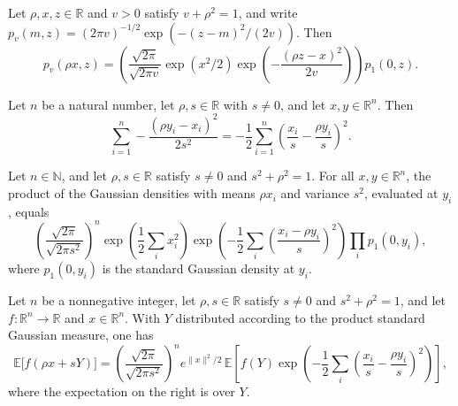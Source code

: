 \begin{lemma}
\label{BooleanAnalysis.GaussianSpace.gaussianPDFReal_noise_eq}
\leanok
{}
Let $\rho,x,z\in\mathbb R$ and $v>0$ satisfy $v+\rho^2=1$, and write $p_v(m,z)=(2\pi
v)^{-1/2}\exp(-(z-m)^2/(2v))$. Then
\[p_v(\rho x,z)=\left(\frac{\sqrt{2\pi}}{\sqrt{2\pi v}}\exp(x^2/2)\exp\left(-\frac{(\rho z-x)^2}{2v}\right)\right)p_1(0,z).\]
\end{lemma}

\begin{lemma}
\label{BooleanAnalysis.GaussianSpace.gaussianNoise_exponent_sum}
\leanok
{}
Let $n$ be a natural number, let $\rho,s\in\mathbb R$ with $s\ne0$, and let
$x,y\in\mathbb R^n$. Then
\[\sum_{i=1}^n -\frac{(\rho y_i-x_i)^2}{2s^2}=-\frac12\sum_{i=1}^n\left(\frac{x_i}{s}-\frac{\rho y_i}{s}\right)^2.\]
\end{lemma}

\begin{lemma}
\label{BooleanAnalysis.GaussianSpace.gaussianProductDensity_noise_eq}
\leanok
{}
Let $n\in\mathbb N$, and let $\rho,s\in\mathbb R$ satisfy $s\ne0$ and $s^2+\rho^2=1$.
For all $x,y\in\mathbb R^n$, the product of the Gaussian densities with means $\rho x_i$
and variance $s^2$, evaluated at $y_i$, equals
\[\left(\frac{\sqrt{2\pi}}{\sqrt{2\pi s^2}}\right)^n\exp\!\left(\frac{1}{2}\sum_i x_i^2\right)\exp\!\left(-\frac{1}{2}\sum_i\left(\frac{x_i-\rho y_i}{s}\right)^2\right)\prod_i p_1(0,y_i),\]
where $p_1(0,y_i)$ is the standard Gaussian density at $y_i$.
\end{lemma}

\begin{lemma}
\label{BooleanAnalysis.GaussianSpace.integral_gaussianNoise_densityFactorization}
\leanok
{}
Let $n$ be a nonnegative integer, let $\rho,s\in\mathbb R$ satisfy $s\ne0$ and
$s^2+\rho^2=1$, and let $f:\mathbb R^n\to\mathbb R$ and $x\in\mathbb R^n$. With $Y$
distributed according to the product standard Gaussian measure, one has
\[\mathbb E\bigl[f(\rho x+sY)\bigr]=\left(\frac{\sqrt{2\pi}}{\sqrt{2\pi s^2}}\right)^n e^{\|x\|^2/2}\,\mathbb E\left[f(Y)\exp\!\left(-\frac12\sum_i\left(\frac{x_i}{s}-\frac{\rho y_i}{s}\right)^2\right)\right],\]
where the expectation on the right is over $Y$.
\end{lemma}
